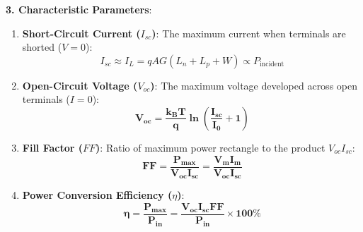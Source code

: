 \begin{theorysol}
\textbf{3. Characteristic Parameters}:
\begin{enumerate}
    \item \textbf{Short-Circuit Current ($I_{sc}$)}: The maximum current when terminals are shorted ($V=0$):
    \begin{equation}
    I_{sc} \approx I_L = q A G (L_n + L_p + W) \propto P_{\text{incident}}
    \end{equation}
    \item \textbf{Open-Circuit Voltage ($V_{oc}$)}: The maximum voltage developed across open terminals ($I=0$):
    \begin{equation}
    \mathbf{V_{oc} = \frac{k_B T}{q}\ln\left(\frac{I_{sc}}{I_0} + 1\right)}
    \end{equation}
    \item \textbf{Fill Factor ($FF$)}: Ratio of maximum power rectangle to the product $V_{oc} I_{sc}$:
    \begin{equation}
    \mathbf{FF = \frac{P_{\text{max}}}{V_{oc} I_{sc}} = \frac{V_m I_m}{V_{oc} I_{sc}}}
    \end{equation}
    \item \textbf{Power Conversion Efficiency ($\eta$)}:
    \begin{equation}
    \mathbf{\eta = \frac{P_{\text{max}}}{P_{\text{in}}} = \frac{V_{oc} I_{sc} FF}{P_{\text{in}}} \times 100\%}
    \end{equation}
\end{enumerate}
\end{theorysol}
\vspace{4mm}

